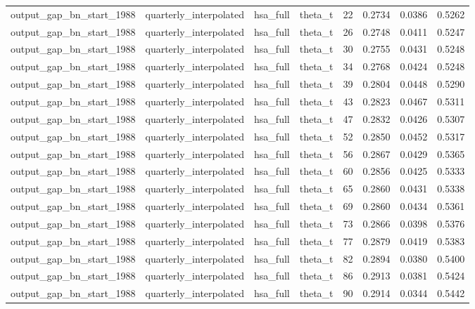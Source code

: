 \begin{tabular}{llllrrrr}
output\_gap\_bn\_start\_1988 & quarterly\_interpolated & hsa\_full & theta\_t & 22 & 0.2734 & 0.0386 & 0.5262 \\
output\_gap\_bn\_start\_1988 & quarterly\_interpolated & hsa\_full & theta\_t & 26 & 0.2748 & 0.0411 & 0.5247 \\
output\_gap\_bn\_start\_1988 & quarterly\_interpolated & hsa\_full & theta\_t & 30 & 0.2755 & 0.0431 & 0.5248 \\
output\_gap\_bn\_start\_1988 & quarterly\_interpolated & hsa\_full & theta\_t & 34 & 0.2768 & 0.0424 & 0.5248 \\
output\_gap\_bn\_start\_1988 & quarterly\_interpolated & hsa\_full & theta\_t & 39 & 0.2804 & 0.0448 & 0.5290 \\
output\_gap\_bn\_start\_1988 & quarterly\_interpolated & hsa\_full & theta\_t & 43 & 0.2823 & 0.0467 & 0.5311 \\
output\_gap\_bn\_start\_1988 & quarterly\_interpolated & hsa\_full & theta\_t & 47 & 0.2832 & 0.0426 & 0.5307 \\
output\_gap\_bn\_start\_1988 & quarterly\_interpolated & hsa\_full & theta\_t & 52 & 0.2850 & 0.0452 & 0.5317 \\
output\_gap\_bn\_start\_1988 & quarterly\_interpolated & hsa\_full & theta\_t & 56 & 0.2867 & 0.0429 & 0.5365 \\
output\_gap\_bn\_start\_1988 & quarterly\_interpolated & hsa\_full & theta\_t & 60 & 0.2856 & 0.0425 & 0.5333 \\
output\_gap\_bn\_start\_1988 & quarterly\_interpolated & hsa\_full & theta\_t & 65 & 0.2860 & 0.0431 & 0.5338 \\
output\_gap\_bn\_start\_1988 & quarterly\_interpolated & hsa\_full & theta\_t & 69 & 0.2860 & 0.0434 & 0.5361 \\
output\_gap\_bn\_start\_1988 & quarterly\_interpolated & hsa\_full & theta\_t & 73 & 0.2866 & 0.0398 & 0.5376 \\
output\_gap\_bn\_start\_1988 & quarterly\_interpolated & hsa\_full & theta\_t & 77 & 0.2879 & 0.0419 & 0.5383 \\
output\_gap\_bn\_start\_1988 & quarterly\_interpolated & hsa\_full & theta\_t & 82 & 0.2894 & 0.0380 & 0.5400 \\
output\_gap\_bn\_start\_1988 & quarterly\_interpolated & hsa\_full & theta\_t & 86 & 0.2913 & 0.0381 & 0.5424 \\
output\_gap\_bn\_start\_1988 & quarterly\_interpolated & hsa\_full & theta\_t & 90 & 0.2914 & 0.0344 & 0.5442 \\

\end{tabular}
